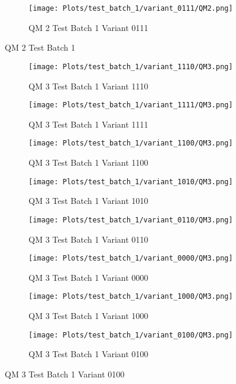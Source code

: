 \documentclass{DissertateFigs}
\begin{document}
\begin{figure}[t!]
\medskip

    \begin{subfigure}{0.47\textwidth}
    \texttt{[image: Plots/test\_batch\_1/variant\_0111/QM2.png]}
    \caption{QM 2 Test Batch 1 Variant 0111}
    \end{subfigure}
\caption{QM 2 Test Batch 1}
    \end{figure}
\clearpage
\begin{figure}[t!]
    \begin{subfigure}{0.47\textwidth}
    \texttt{[image: Plots/test\_batch\_1/variant\_1110/QM3.png]}
    \caption{QM 3 Test Batch 1 Variant 1110}
    \end{subfigure}
    \begin{subfigure}{0.47\textwidth}
    \texttt{[image: Plots/test\_batch\_1/variant\_1111/QM3.png]}
    \caption{QM 3 Test Batch 1 Variant 1111}
    \end{subfigure}

\medskip

    \begin{subfigure}{0.47\textwidth}
    \texttt{[image: Plots/test\_batch\_1/variant\_1100/QM3.png]}
    \caption{QM 3 Test Batch 1 Variant 1100}
    \end{subfigure}
    \begin{subfigure}{0.47\textwidth}
    \texttt{[image: Plots/test\_batch\_1/variant\_1010/QM3.png]}
    \caption{QM 3 Test Batch 1 Variant 1010}
    \end{subfigure}

\medskip

    \begin{subfigure}{0.47\textwidth}
    \texttt{[image: Plots/test\_batch\_1/variant\_0110/QM3.png]}
    \caption{QM 3 Test Batch 1 Variant 0110}
    \end{subfigure}
    \begin{subfigure}{0.47\textwidth}
    \texttt{[image: Plots/test\_batch\_1/variant\_0000/QM3.png]}
    \caption{QM 3 Test Batch 1 Variant 0000}
    \end{subfigure}

\medskip

    \begin{subfigure}{0.47\textwidth}
    \texttt{[image: Plots/test\_batch\_1/variant\_1000/QM3.png]}
    \caption{QM 3 Test Batch 1 Variant 1000}
    \end{subfigure}
    \begin{subfigure}{0.47\textwidth}
    \texttt{[image: Plots/test\_batch\_1/variant\_0100/QM3.png]}
    \caption{QM 3 Test Batch 1 Variant 0100}
    \end{subfigure}


\end{figure}
\end{document}

